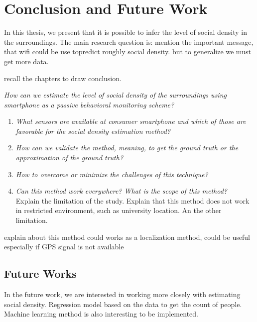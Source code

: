 \chapter{Conclusion and Future Work}
\label{ch:conclusion-future-work} %
In this thesis, we present that it is possible to infer the level of social density in the surroundings. The main research question is:
mention the important message, that wifi could be use topredict roughly social density. but to generalize we must get more data.

recall the chapters to draw conclusion.

\begin{displayquote}\textit{
How can we estimate the level of social density of the surroundings using smartphone as a passive behavioral monitoring scheme?}
\end{displayquote}

\begin{enumerate}
	\item \textit{What sensors are available at consumer smartphone and which of those are favorable for the social density estimation method?}\\
	

	\item \textit{How can we validate the method, meaning, to get the ground truth or the approximation of the ground truth?}\\
	

	\item \textit{How to overcome or minimize the challenges of this technique?}\\
	

	\item \textit{Can this method work everywhere? What is the scope of this method?}\\
	Explain the limitation of the study.
	Explain that this method does not work in restricted environment, such as university location.
	An the other limitation.
\end{enumerate}

explain about this method could works as a localization method, could be useful especially if GPS signal is not available

\section{Future Works} %
\label{sec:future_works}
In the future work, we are interested in working more closely with estimating social density. Regression model based on the data to get the count of people. Machine learning method is also interesting to be implemented.

